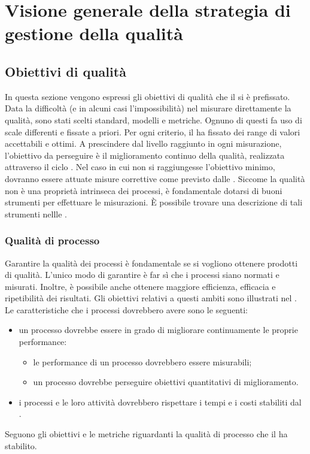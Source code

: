 \newpage



\section{Visione generale della strategia di gestione della qualità}
\subsection{Obiettivi di qualità}
In questa sezione vengono espressi gli obiettivi di qualità che il  si è prefissato. Data la difficoltà (e in alcuni casi l'impossibilità) nel misurare direttamente la qualità, sono stati scelti standard, modelli e metriche.
Ognuno di questi fa uso di scale differenti e fissate a priori. Per ogni criterio, il  ha fissato dei range di valori accettabili e ottimi. A prescindere dal livello raggiunto in ogni misurazione, l'obiettivo da perseguire è il miglioramento continuo della qualità, realizzata attraverso il ciclo . Nel caso in cui non si raggiungesse l'obiettivo minimo, dovranno essere attuate misure correttive come previsto dalle \ndpv.	
Siccome la qualità non è una proprietà intrinseca dei processi, è fondamentale dotarsi di buoni strumenti per effettuare le misurazioni. È possibile trovare una descrizione di tali strumenti nellle \ndpv.

\subsubsection{Qualità di processo}
Garantire la qualità dei processi è fondamentale se si vogliono ottenere prodotti di qualità. L'unico modo di garantire  è far sì che  i processi siano normati e misurati. Inoltre, è possibile anche ottenere maggiore efficienza, efficacia e ripetibilità dei risultati. Gli obiettivi relativi a questi ambiti sono illustrati nel \pdpv.
Le caratteristiche che i processi dovrebbero avere sono le seguenti:

\begin{itemize}
	\item un processo dovrebbe essere in grado di migliorare continuamente le proprie performance:
	\begin{itemize}
		\item le performance di un processo dovrebbero essere misurabili;
		\item un processo dovrebbe perseguire obiettivi quantitativi di miglioramento.
	\end{itemize}
	\item i processi e le loro attività dovrebbero rispettare i tempi e i costi stabiliti dal \pdpv.\\
\end{itemize}
Seguono gli obiettivi e le metriche riguardanti la qualità di processo che il  ha stabilito.

